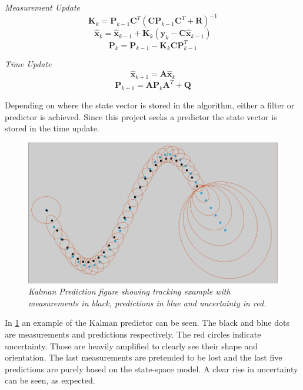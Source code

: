 \emph{Measurement Update}
\begin{equation}
	\textbf{K}_{k} = \textbf{P}_{k-1}\textbf{C}^T(\textbf{C}\textbf{P}_{k-1}\textbf{C}^T + \textbf{R})^{-1}
\end{equation}
\begin{equation}
	\hat{\textbf{x}}_k = \hat{\textbf{x}}_{k-1} + \textbf{K}_k (\textbf{y}_k - \textbf{C}\hat{\textbf{x}}_{k-1})
\end{equation}
\begin{equation}
	\textbf{P}_k = \textbf{P}_{k-1} - \textbf{K}_k\textbf{C}\textbf{P}_{k-1}^T
\end{equation}

\emph{Time Update}
\begin{equation}
	\hat{\textbf{x}}_{k+1} = \textbf{A}\hat{\textbf{x}}_{k}
\end{equation}
\begin{equation}
	\textbf{P}_{k+1} = \textbf{A}\textbf{P}_{k}\textbf{A}^T + \textbf{Q}
\end{equation}

Depending on where the state vector is stored in the algorithm, either a filter or predictor is achieved. Since this project seeks a predictor the state vector is stored in the time update.

\begin{figure}[h]
	\centering
	\includegraphics[width=\linewidth]{images/Kalmask2}
	\caption{\textit{Kalman Prediction figure showing tracking example with measurements in black, predictions in blue and uncertainty in red.}}
	\label{fig:kalman_fig} %
\end{figure}
\pagebreak

In \ref{fig:kalman_fig} an example of the Kalman predictor can be seen. The black and blue dots are measurements and predictions respectively. The red circles indicate uncertainty. Those are heavily amplified to clearly see their shape and orientation. The last measurements are pretended to be lost and the last five predictions are purely based on the state-space model. A clear rise in uncertainty can be seen, as expected. 
